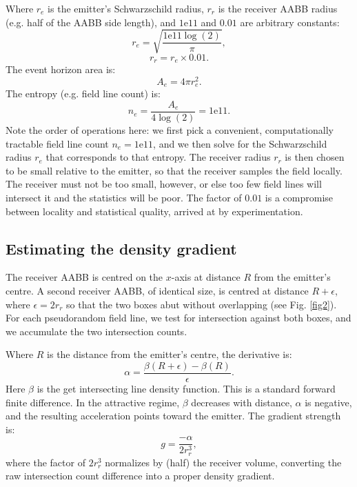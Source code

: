 \documentclass[10pt]{article}
\begin{document}
Where $r_{e}$ is the emitter's Schwarzschild radius, $r_{r}$ is the receiver AABB radius (e.g. half of the AABB side length), and $1\mathrm{e}11$ and $0.01$ are arbitrary constants:
\begin{equation}
r_{e} = \sqrt{\frac{1\mathrm{e}11 \log(2)}{\pi}},
\end{equation}
\begin{equation}
r_{r} = r_{e} \times 0.01.
\end{equation}
The event horizon area is:
\begin{equation}
A_{e} = 4 \pi r_{e}^2.
\end{equation}
The entropy (e.g. field line count) is:
\begin{equation}
n_{e} = \frac{A_{e}}{4 \log(2)} = 1\mathrm{e}11.
\end{equation}
Note the order of operations here: we first pick a convenient, computationally tractable field line count $n_e = 1\mathrm{e}11$, and we then solve for the Schwarzschild radius $r_e$ that corresponds to that entropy.
The receiver radius $r_r$ is then chosen to be small relative to the emitter, so that the receiver samples the field locally.
The receiver must not be too small, however, or else too few field lines will intersect it and the statistics will be poor.
The factor of $0.01$ is a compromise between locality and statistical quality, arrived at by experimentation.

\subsection{Estimating the density gradient}

The receiver AABB is centred on the $x$-axis at distance $R$ from the emitter's centre.
A second receiver AABB, of identical size, is centred at distance $R + \epsilon$, where $\epsilon = 2 r_r$ so that the two boxes abut without overlapping (see Fig. \ref{fig2}).
For each pseudorandom field line, we test for intersection against both boxes, and we accumulate the two intersection counts.

Where $R$ is the distance from the emitter's centre, the derivative is:
\begin{equation}
\alpha = \frac{\beta(R + \epsilon) - \beta(R)}{\epsilon}.
\end{equation}
Here $\beta$ is the get intersecting line density function.
This is a standard forward finite difference.
In the attractive regime, $\beta$ decreases with distance, $\alpha$ is negative, and the resulting acceleration points toward the emitter.
The gradient strength is:
\begin{equation}
g = \frac{-\alpha}{2 r_{r}^3},
\end{equation}
where the factor of $2 r_r^3$ normalizes by (half) the receiver volume, converting the raw intersection count difference into a proper density gradient.
\end{document}
